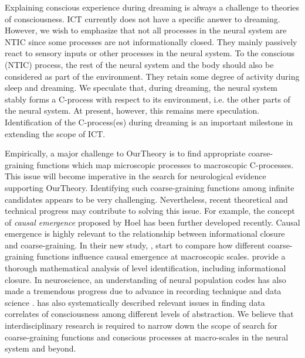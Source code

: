 \documentclass[utf8]{article}
\begin{document}
        Explaining conscious experience during dreaming is always a challenge to theories of consciousness. ICT currently does not have a specific answer to dreaming. However, we wish to emphasize that not all processes in the neural system are NTIC since some processes are not informationally closed. They mainly passively react to sensory inputs or other processes in the neural system. To the conscious (NTIC) process, the rest of the neural system and the body should also be considered as part of the environment. They retain some degree of activity during sleep and dreaming. We speculate that, during dreaming, the neural system stably forms a C-process with respect to its environment, i.e. the other parts of the neural system. At present, however, this remains mere speculation. Identification of the C-process(es) during dreaming is an important milestone in extending the scope of ICT.
        
        Empirically, a major challenge to \ac{OurTheory} is to find appropriate coarse-graining functions which map microscopic processes to macroscopic C-processes. This issue will become imperative in the search for neurological evidence supporting \ac{OurTheory}. Identifying such coarse-graining functions among infinite candidates \citep{price2007causation} appears to be very challenging. Nevertheless, recent theoretical and technical progress may contribute to  solving this issue. For example, the concept of \textit{causal emergence} proposed by Hoel \citep{Hoel19790, Hoel2018} has been further developed recently. Causal emergence is highly relevant to the relationship between informational closure and coarse-graining. In their new study, \cite{klein2019uncertainty}, start to compare how different coarse-graining functions influence causal emergence at macroscopic scales. \cite{PFANTE.2014, PFANTE.2014b} provide a thorough mathematical analysis of level identification, including informational closure. In neuroscience, an understanding of neural population codes has also made a tremendous progress due to advance in recording technique and data science \citep{Kohn2016, panzeri2015neural}. \cite{Gamez2016} has also systematically described relevant issues in finding data correlates of consciousness among different levels of abstraction. We believe that interdisciplinary research is required to narrow down the scope of search for coarse-graining functions and conscious processes at macro-scales in the neural system and beyond.
        
\end{document}
